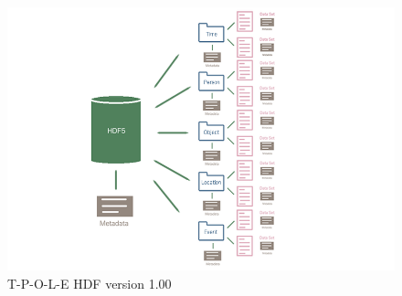\begin{figure}[H]
    \centering
    \includegraphics[width=14cm]{figures/technical/HDF5_TPOLE.png}
    \caption{T-P-O-L-E HDF version 1.00}
    \label{fig:figHDF5TPOLE}
\end{figure}